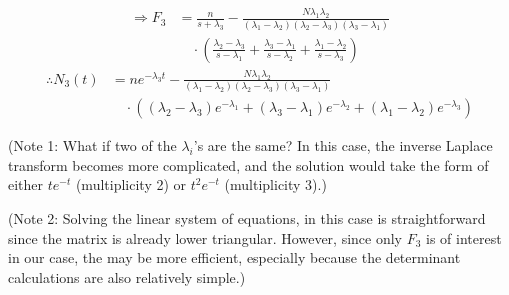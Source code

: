 \begin{align*}
    \Rightarrow F_3
    &= \frac{n}{s + \lambda_3} - \frac{N\lambda_1 \lambda_2}{(\lambda_1 - \lambda_2) (\lambda_2 - \lambda_3) (\lambda_3 - \lambda_1)} \\
    &\quad\cdot \left(
        \frac{\lambda_2 - \lambda_3}{s - \lambda_1} +
        \frac{\lambda_3 - \lambda_1}{s - \lambda_2} +
        \frac{\lambda_1 - \lambda_2}{s - \lambda_3}
    \right)
\end{align*}
\begin{align*}
    \therefore N_3(t)
    &= ne^{-\lambda_3 t} - \frac{N\lambda_1 \lambda_2}{(\lambda_1 - \lambda_2) (\lambda_2 - \lambda_3) (\lambda_3 - \lambda_1)} \\
    &\quad\cdot \left(
        (\lambda_2 - \lambda_3) e^{-\lambda_1} +
        (\lambda_3 - \lambda_1) e^{-\lambda_2} +
        (\lambda_1 - \lambda_2) e^{-\lambda_3}
    \right)
\end{align*}

(Note 1: What if two of the $\lambda_i$'s are the same?
In this case, the inverse Laplace transform becomes more complicated,
and the solution would take the form of
either $te^{-t}$ (multiplicity 2) or $t^2 e^{-t}$ (multiplicity 3).)

(Note 2: Solving the linear system of equations, in this case is straightforward
since the matrix is already lower triangular.
However, since only $F_3$ is of interest in our case, the
may be more efficient, especially because the determinant calculations are also relatively simple.)